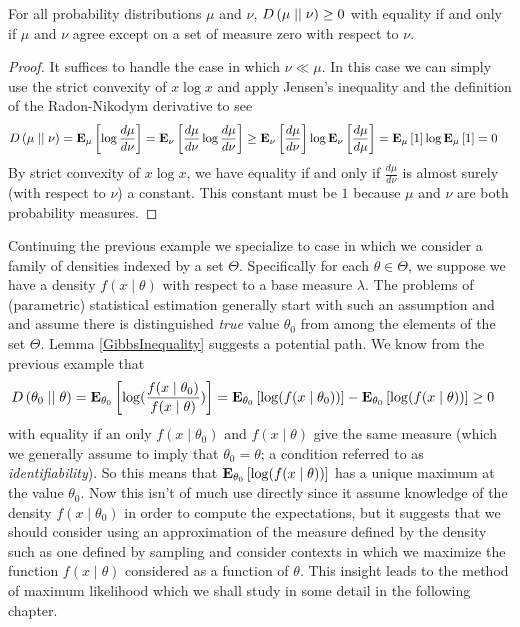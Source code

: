 \begin{lem}\label{GibbsInequality}For all
  probability distributions $\mu$ and $\nu$, $\kldiv{\mu}{\nu} \geq 0$
  with equality if and only if $\mu$ and $\nu$ agree except on a set
  of measure zero with respect to $\nu$.
\end{lem}
\begin{proof}
It suffices to handle the case in which $\nu \ll \mu$.  In this case we
can simply use the strict convexity of $x \log x$ and apply Jensen's
inequality and the definition of the Radon-Nikodym derivative to see
\begin{align*}
\kldiv{\mu}{\nu} &= \sexpectation{\log \frac{d\mu}{d\nu}}{\mu} = \sexpectation{\frac{d\mu}{d\nu}\log \frac{d\mu}{d\nu}}{\nu} \geq
\sexpectation{\frac{d\mu}{d\nu}}{\nu} \log \sexpectation{\frac{d\mu}{d\mu}}{\nu} = 
\sexpectation{1}{\mu} \log \sexpectation{1}{\mu} = 0
\end{align*}
By strict convexity of $x \log x$, we have equality if and only if $\frac{d\mu}{d\nu}$ is
almost surely (with respect to $\nu$) a constant.  This constant must be $1$ because $\mu$ and
$\nu$ are both probability measures.  
\end{proof}

\begin{examp}Continuing the previous example we specialize to case in
  which we consider a family of densities indexed by a set $\Theta$.
  Specifically for each $\theta \in \Theta$, we suppose we have a
  density $f(x \mid \theta)$ with respect to a base measure
  $\lambda$.  The problems of (parametric) statistical estimation generally start
  with such an assumption and and assume there is distinguished
  \emph{true} value $\theta_0$ from among the elements of the set
  $\Theta$.  Lemma \ref{GibbsInequality} suggests a potential path.  We know
  from the previous example that 
\begin{align*}
\kldiv{\theta_0}{\theta} &= \sexpectation{ \log( \frac{f(x \mid \theta_0)}{f(x
  \mid \theta)})}{\theta_0} = \sexpectation{ \log( f(x \mid \theta_0))
}{\theta_0} - \sexpectation{ \log( f(x \mid \theta))
}{\theta_0} \geq 0
\end{align*}
with equality if an only $f(x \mid \theta_0)$ and $f(x \mid \theta)$
give the same measure (which we generally assume to imply that
$\theta_0 = \theta$; a condition referred to as
\emph{identifiability}).  So this means that $\sexpectation{ \log( f(x \mid \theta))
}{\theta_0}$ has a unique maximum at the value $\theta_0$.  Now this
isn't of much use directly since it assume knowledge of the density
$f(x \mid \theta_0)$ in order to compute the expectations, but it
suggests that we should consider using an approximation of the measure
defined by the density such as one defined by sampling and consider
contexts in which we maximize the function $f(x \mid \theta)$
considered as a function of $\theta$.  This insight leads to the
method of maximum likelihood which we shall study in some detail in
the following chapter.  
\end{examp}

